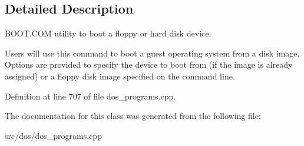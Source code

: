\subsection{Detailed Description}
B\-O\-O\-T.\-C\-O\-M utility to boot a floppy or hard disk device. 

Users will use this command to boot a guest operating system from a disk image. Options are provided to specify the device to boot from (if the image is already assigned) or a floppy disk image specified on the command line. 

Definition at line 707 of file dos\-\_\-programs.\-cpp.



The documentation for this class was generated from the following file\-:\begin{DoxyCompactItemize}
\item 
src/dos/dos\-\_\-programs.\-cpp\end{DoxyCompactItemize}
